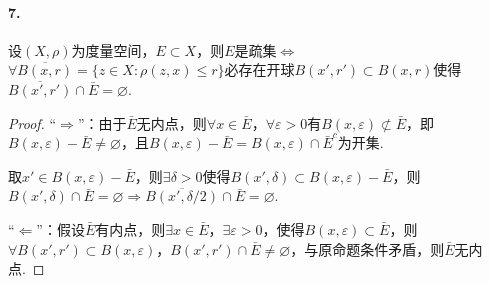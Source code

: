 \documentclass[12pt, a4paper, oneside]{ctexart}
\let\leq=\leqslant %
\def\ol{\overline}          %
\begin{document}
\paragraph*{7.}设$(X,\rho)$为度量空间，$E\subset X$，则$E$是疏集$\iff$$\forall \ol{B(x, r)} = \{z\in X:\rho(z, x)\leq r\}$必存在开球$B(x',r')\subset B(x, r)$使得$\ol{B(x',r')}\cap \bar{E}=\varnothing$.
\begin{proof}
    “$\Rightarrow$”：由于$\bar{E}$无内点，则$\forall x\in \bar{E}$，$\forall \varepsilon > 0$有$B(x, \varepsilon)\not\subset \bar{E}$，即$B(x,\varepsilon) - \bar{E}\neq\varnothing$，且$B(x,\varepsilon)-\bar{E} = B(x,\varepsilon)\cap \bar{E}^c$为开集.

    取$x'\in B(x,\varepsilon) - \bar{E}$，则$\exists \delta  > 0$使得$B(x',\delta)\subset B(x,\varepsilon)-\bar{E}$，则$B(x',\delta)\cap \bar{E} = \varnothing\Rightarrow \ol{B(x',\delta/2)}\cap \bar{E} = \varnothing$.
    
    “$\Leftarrow$”：假设$\bar{E}$有内点，则$\exists x\in \bar{E}$，$\exists \varepsilon > 0$，使得$B(x, \varepsilon) \subset \bar{E}$，则$\forall B(x',r')\subset B(x, \varepsilon)$，$B(x',r')\cap \bar{E}\neq\varnothing$，与原命题条件矛盾，则$\bar{E}$无内点.
\end{proof}

\iffalse
\centerline{
    \texttt{[image: figure.png]}
}
\renewcommand\arraystretch{0.8} %
\begin{table}[!htbp] %
    \centering %
    \begin{tabular}{p{1cm}<{\centering}p{1cm}<{\centering}p{3cm}<{\centering}p{5cm}<{\centering}} %
        \toprule
        $x_i$ & $f[x_1]$ & $f[x_i,x_{i+1}]$ & $f[x_i,x_{i+1},x_{i+2}]$ \\
        \midrule
        $x_0$ & $f(x_0)$ &                  &                          \\
        $x_0$ & $f(x_0)$ & $f'(x_0)$        &                          \\
        $x_0$ & $f(x_1)$ & $\frac{f(x_1)-f(x_0)}{x_1-x_0}$ & $\frac{f(x_1)-f(x_0)}{(x_1-x_0)^2}-\frac{f'(x_0)}{x_1-x_0}$\\
        \bottomrule
    \end{tabular}
\end{table}

\def\Log{\text{Log}} %
$\Log$ %
\fi
\end{document}
